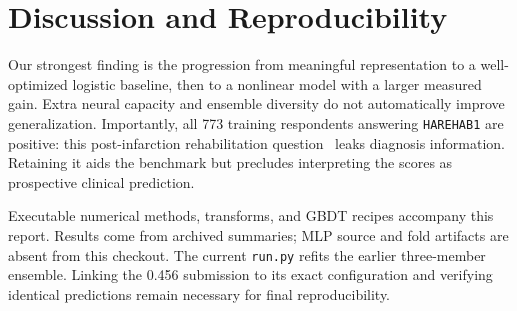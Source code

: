 \documentclass[10pt,conference,compsocconf]{IEEEtran}
\begin{document}
\section{Discussion and Reproducibility}
Our strongest finding is the progression from meaningful representation to
a well-optimized logistic baseline, then to a nonlinear model with a
larger measured gain. Extra neural capacity and ensemble diversity do not
automatically improve generalization. Importantly, all 773 training
respondents answering \texttt{HAREHAB1} are positive: this post-infarction
rehabilitation question~\cite{cdc2015} leaks diagnosis information. Retaining
it aids the benchmark but precludes interpreting the scores as prospective
clinical prediction.

Executable numerical methods, transforms, and GBDT recipes accompany this
report. Results come from archived summaries; MLP source and fold artifacts
are absent from this checkout. The current \texttt{run.py} refits the earlier
three-member ensemble. Linking the 0.456 submission to its exact configuration
and verifying identical predictions remain necessary for final reproducibility.

\clearpage
{}


\end{document}
